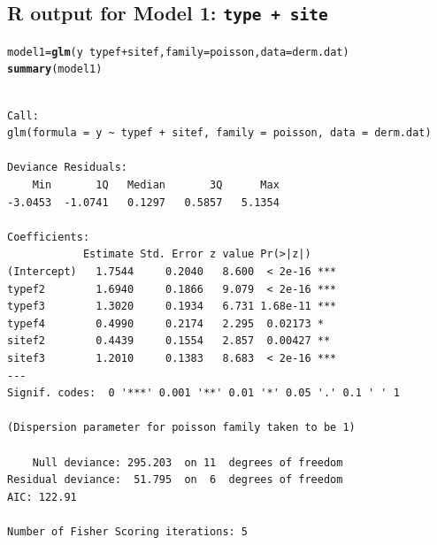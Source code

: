 \documentclass{article}\usepackage[]{graphicx}\usepackage[svgnames]{xcolor}
\makeatletter
\newcommand{\hlopt}[1]{\textcolor[rgb]{0,0,0}{#1}}%
\newcommand{\hlstd}[1]{\textcolor[rgb]{0.345,0.345,0.345}{#1}}%
\newcommand{\hlkwb}[1]{\textcolor[rgb]{0.69,0.353,0.396}{#1}}%
\newcommand{\hlkwc}[1]{\textcolor[rgb]{0.333,0.667,0.333}{#1}}%
\newcommand{\hlkwd}[1]{\textcolor[rgb]{0.737,0.353,0.396}{\textbf{#1}}}%
\newenvironment{kframe}{%
 \def\at@end@of@kframe{}%
 \ifinner\ifhmode%
  \def\at@end@of@kframe{\end{minipage}}%
  \begin{minipage}{\columnwidth}%
 \fi\fi%
 \def\FrameCommand##1{\hskip\@totalleftmargin \hskip-\fboxsep
 \colorbox{shadecolor}{##1}\hskip-\fboxsep
     \hskip-\linewidth \hskip-\@totalleftmargin \hskip\columnwidth}%
 \MakeFramed {\advance\hsize-\width
   \@totalleftmargin\z@ \linewidth\hsize
   \@setminipage}}%
 {\par\unskip\endMakeFramed%
 \at@end@of@kframe}
\newenvironment{knitrout}{}{} %
\makeatother
\begin{document}
\subsection*{R output for Model 1: \texttt{type + site}}
\begin{knitrout}
\color{fgcolor}\begin{kframe}
\begin{alltt}
\hlstd{model1} \hlkwb{=} \hlkwd{glm}\hlstd{(y} \hlopt{~} \hlstd{typef} \hlopt{+} \hlstd{sitef,} \hlkwc{family} \hlstd{= poisson,} \hlkwc{data} \hlstd{= derm.dat)}
\hlkwd{summary}\hlstd{(model1)}
\end{alltt}
\begin{verbatim}

Call:
glm(formula = y ~ typef + sitef, family = poisson, data = derm.dat)

Deviance Residuals: 
    Min       1Q   Median       3Q      Max  
-3.0453  -1.0741   0.1297   0.5857   5.1354  

Coefficients:
            Estimate Std. Error z value Pr(>|z|)    
(Intercept)   1.7544     0.2040   8.600  < 2e-16 ***
typef2        1.6940     0.1866   9.079  < 2e-16 ***
typef3        1.3020     0.1934   6.731 1.68e-11 ***
typef4        0.4990     0.2174   2.295  0.02173 *  
sitef2        0.4439     0.1554   2.857  0.00427 ** 
sitef3        1.2010     0.1383   8.683  < 2e-16 ***
---
Signif. codes:  0 '***' 0.001 '**' 0.01 '*' 0.05 '.' 0.1 ' ' 1

(Dispersion parameter for poisson family taken to be 1)

    Null deviance: 295.203  on 11  degrees of freedom
Residual deviance:  51.795  on  6  degrees of freedom
AIC: 122.91

Number of Fisher Scoring iterations: 5
\end{verbatim}
\end{kframe}
\end{knitrout}
\end{document}
